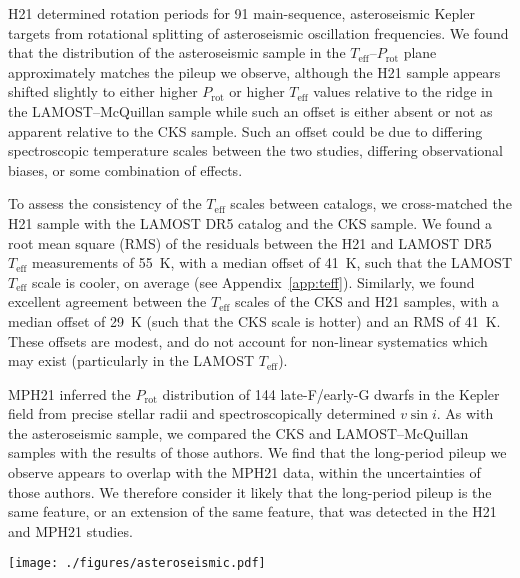\documentclass[trackchanges,twocolumn]{aastex631}
\newcommand{\lamostmcq}{LAMOST--McQuillan\xspace}
\newcommand{\hall}{H21\xspace}
\newcommand{\masuda}{MPH21\xspace}
\newcommand{\teff}{\ensuremath{T_{\mathrm{eff}}}\xspace}
\newcommand{\vsini}{\ensuremath{v \sin i}\xspace}
\newcommand{\prot}{\ensuremath{P_\mathrm{rot}}\xspace}
\begin{document}
\hall determined rotation periods for 91 main-sequence, asteroseismic Kepler targets from rotational splitting of asteroseismic oscillation frequencies. We found that the distribution of the asteroseismic sample in the \teff--\prot plane approximately matches the pileup we observe, although the \hall sample appears shifted slightly to either higher \prot or higher \teff values relative to the ridge in the \lamostmcq sample while such an offset is either absent or not as apparent relative to the CKS sample. Such an offset could be due to differing spectroscopic temperature scales between the two studies, differing observational biases, or some combination of effects.

To assess the consistency of the \teff scales between catalogs, we cross-matched the \hall sample with the LAMOST DR5 catalog and the CKS sample. We found a root mean square (RMS) of the residuals between the \hall and LAMOST DR5 \teff measurements of 55~K, with a median offset of 41~K, such that the LAMOST \teff scale is cooler, on average (see Appendix~\ref{app:teff}). Similarly, we found excellent agreement between the \teff scales of the CKS and \hall samples, with a median offset of 29~K (such that the CKS scale is hotter) and an RMS of 41~K. These offsets are modest, and do not account for non-linear systematics which may exist (particularly in the LAMOST \teff).

\masuda inferred the \prot distribution of 144 late-F/early-G dwarfs in the Kepler field from precise stellar radii and spectroscopically determined \vsini. As with the asteroseismic sample, we compared the CKS and \lamostmcq samples with the results of those authors. We find that the long-period pileup we observe appears to overlap with the \masuda data, within the uncertainties of those authors. We therefore consider it likely that the long-period pileup is the same feature, or an extension of the same feature, that was detected in the \hall and \masuda studies.

\begin{figure*}
    \centering
    \texttt{[image: ./figures/asteroseismic.pdf]}
    \caption{Comparison of CKS (left column) and \lamostmcq samples (right column) with the \hall main-sequence asteroseismic sample (top row) and the \masuda sample (bottom row) in the \teff--\prot plane. The black point indicates the Sun. Note, the CKS, LAMOST, and \hall samples derive \teff from distinct pipelines. In the top panels, constant offsets of -29~K and +41~K were added to the CKS and LAMOST \teff, respectively, based on comparisons to those stars with overlap in the H21 sample (see \S~\ref{subsec:asteroseismic} and Appendix~\ref{app:teff}). Using LAMOST \teff, where it exists, for the \hall sample brings that sample into even closer agreement with the long-period pileup in the LAMOST-McQuillan sample.}
    \label{fig:asteroseismic}
\end{figure*}
\end{document}

